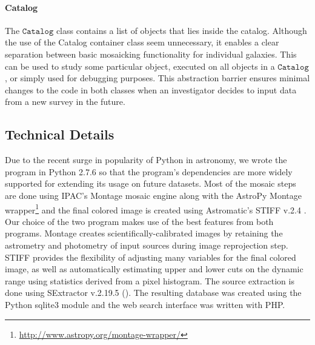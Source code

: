 \documentclass[5p]{elsarticle}
\begin{document}
	\paragraph{Catalog}
	The $\texttt{Catalog}$ class contains a list of objects that lies inside the catalog. Although the use of the Catalog container class seem unnecessary, it enables a clear separation between basic mosaicking functionality for individual galaxies. This can be used to study some particular object, executed on all objects in a $\texttt{Catalog}$, or simply used for debugging purposes. This abstraction barrier ensures minimal changes to the code in both classes when an investigator decides to input data from a new survey in the future.

		\subsection{Technical Details}
		Due to the recent surge in popularity of Python in astronomy, we wrote the program in Python 2.7.6 so that the program's dependencies are more widely supported for extending its usage on future datasets. Most of the mosaic steps are done using IPAC's Montage  \cite{montage} mosaic engine along with the AstroPy Montage wrapper\footnote{\url{http://www.astropy.org/montage-wrapper/}} and the final colored image is created using Astromatic's STIFF v.2.4 \cite{stiff}. Our choice of the two program makes use of the best features from both programs. Montage creates scientifically-calibrated images by retaining the astrometry and photometry of input sources during image reprojection step. STIFF provides the flexibility of adjusting many variables for the final colored image, as well as automatically estimating upper and lower cuts on the dynamic range using statistics derived from a pixel histogram.  %
The source extraction is done using SExtractor v.2.19.5 (\citet{sextractor}). The resulting database was created using the Python sqlite3 module and the web search interface was written with PHP.
\end{document}
